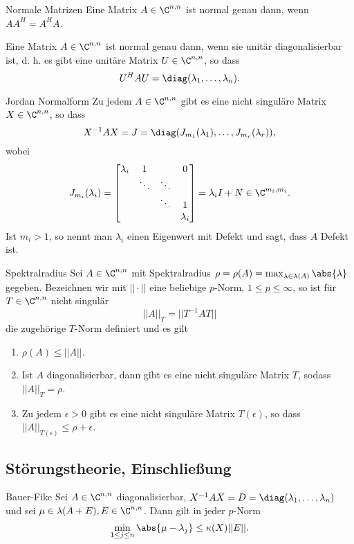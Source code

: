 \begin{karte}{Normale Matrizen}
    Eine Matrix \(A\in \C^{n,n}\) ist normal genau dann, wenn \(A A^H = A^H A\). 

    Eine Matrix \(A\in \C^{n,n}\) ist normal genau dann, wenn sie unitär diagonalisierbar ist, 
    d. h. es gibt eine unitäre Matrix \(U\in \C^{n,n}\), so dass 
    \[ U^H A U = \diag(\lambda_1, \ldots, \lambda_n). \]
\end{karte}

\begin{karte}{Jordan Normalform}
    Zu jedem \( A \in \C^{n,n} \) gibt es eine nicht singuläre Matrix 
    \(X\in \C^{n,n}\), so dass
    \[ X^{-1} A X = J = \diag(J_{m_1}(\lambda_1), \ldots, J_{m_r}(\lambda_r)), \]
    wobei 
    \[ J_{m_i}(\lambda_i) = \left[ \begin{matrix}
        \lambda_i & 1 & & 0 \\
        & \ddots & \ddots & \\
        & & \ddots & 1 \\
        & & & \lambda_i
    \end{matrix} \right] = \lambda_i I + N \in \C^{m_i,m_i}. \]
    Ist \(m_i > 1\), so nennt man \(\lambda_i\) einen Eigenwert 
    mit Defekt und sagt, dass \(A\) Defekt ist.
\end{karte}

\begin{karte}{Spektralradius}
    Sei \(A\in \C^{n,n}\) mit Spektralradius \(\rho = \rho(A) = \max_{\lambda\in\lambda(A)} \abs{\lambda}\) gegeben.
    Bezeichnen wir mit \( ||\cdot || \) eine beliebige \(p\)-Norm, \(1\leq p \leq \infty\), 
    so ist für \(T\in \C^{n,n}\) nicht singulär 
    \[ ||A||_T = ||T^{-1} A T|| \] 
    die zugehörige \(T\)-Norm definiert und es gilt 
    \begin{enumerate}
        \item \(\rho(A)\leq ||A||\).
        \item Ist \(A\) diagonalisierbar, dann gibt es eine nicht singuläre Matrix 
        \(T\), sodass \( ||A||_T = \rho \).
        \item Zu jedem \(\epsilon > 0 \) gibt es eine nicht singuläre Matrix 
        \(T(\epsilon)\), so dass \(||A||_{T(\epsilon)} \leq \rho + \epsilon\).
    \end{enumerate}
\end{karte}

\subsection{Störungstheorie, Einschließung}
\begin{karte}{Bauer-Fike}
    Sei \(A\in \C^{n,n}\) diagonalisierbar, \( X^{-1} A X = D = \diag(\lambda_1, \ldots, \lambda_n) \)
    und sei \( \mu \in \lambda(A+E), E \in \C^{n,n} \). Dann gilt in jeder \(p\)-Norm 
    \[ \min_{1\leq j\leq n} \abs{\mu - \lambda_j} \leq \kappa(X) ||E||. \]
\end{karte}

